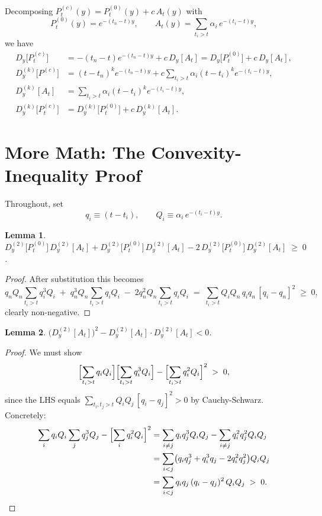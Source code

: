 \documentclass[11pt]{article}
\newtheorem{lemma}{Lemma}
\theoremstyle{definition}
\newcommand{\dDy}[1]{D_{y}^{(#1)}}              %
\begin{document}
Decomposing $P^{(c)}_t(y) = P^{(0)}_t(y) + c\,A_t(y)$ with
\[
P^{(0)}_t(y) = e^{-(t_n-t)y}, \qquad
A_t(y) = \sum_{t_i > t} \alpha_i\, e^{-(t_i-t)y},
\]
we have
\begin{align}
D_y\bigl[P^{(c)}_t\bigr] &= -(t_n-t)e^{-(t_n-t)y} + c\, D_y[A_t]
                          = D_y\bigl[P^{(0)}_t\bigr] + c\,D_y[A_t],
\label{eq:DyPdec}\\
\dDy{k}\bigl[P^{(c)}\bigr] &= (t-t_n)^k e^{-(t_n-t)y}
        + c\sum_{t_i>t}\alpha_i(t-t_i)^k e^{-(t_i-t)y}, \label{eq:DkP}\\
\dDy{k}[A_t] &= \sum_{t_i > t}\alpha_i(t-t_i)^k e^{-(t_i-t)y},
\label{eq:DkA}\\
\dDy{k}\bigl[P^{(c)}_t\bigr] &= \dDy{k}\bigl[P^{(0)}_t\bigr]
                                 + c\,\dDy{k}[A_t]. \label{eq:DkPdec}
\end{align}


\section{More Math: The Convexity-Inequality Proof}\label{sec:more-math}

Throughout, set
\[
q_i \equiv (t - t_i), \qquad Q_i \equiv \alpha_i\,e^{-(t_i-t)y}.
\]

\begin{lemma}\label{lem:positivity}
$\dDy{2}\bigl[P^{(0)}_t\bigr]\,\dDy{2}[A_t]
 + \dDy{2}\bigl[P^{(0)}_t\bigr]\,\dDy{2}[A_t]
 - 2\,\dDy{2}\bigl[P^{(0)}_t\bigr]\,\dDy{2}[A_t] \;\ge\; 0$.
\end{lemma}

\begin{proof}
After substitution this becomes
\[
q_n Q_n \sum_{t_i>t} q_i^3 Q_i
\;+\; q_n^3 Q_n \sum_{t_i>t} q_i Q_i
\;-\; 2 q_n^2 Q_n \sum_{t_i>t} q_i Q_i
\;=\;
\sum_{t_i>t} Q_i Q_n\, q_i q_n\,[q_i - q_n]^2
\;\ge\; 0,
\]
clearly non-negative.
\end{proof}

\begin{lemma}\label{lem:A-negativity}
$\bigl(\dDy{2}[A_t]\bigr)^2 - \dDy{2}[A_t]\cdot\dDy{2}[A_t] < 0$.
\end{lemma}

\begin{proof}
We must show
\[
\Bigl[\sum_{t_i>t} q_i Q_i\Bigr]
\Bigl[\sum_{t_i>t} q_i^3 Q_i\Bigr]
- \Bigl[\sum_{t_i>t} q_i^2 Q_i\Bigr]^2 \;>\; 0,
\]
since the LHS equals
$\sum_{t_i,t_j > t} Q_i Q_j\,[q_i - q_j]^2 > 0$
by Cauchy-Schwarz. Concretely:
\begin{align*}
\sum_i q_i Q_i \sum_j q_j^3 Q_j - \Bigl[\sum_i q_i^2 Q_i\Bigr]^2
&= \sum_{i \ne j} q_i q_j^3 Q_i Q_j - \sum_{i\ne j} q_i^2 q_j^2 Q_i Q_j \\
&= \sum_{i<j}\bigl(q_i q_j^3 + q_i^3 q_j - 2 q_i^2 q_j^2\bigr) Q_i Q_j\\
&= \sum_{i<j} q_i q_j\, (q_i - q_j)^2\, Q_i Q_j \;>\; 0.
\qedhere
\end{align*}
\end{proof}
\end{document}
